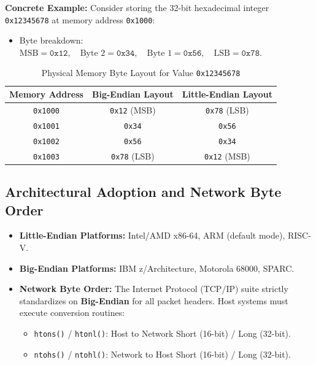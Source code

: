 \textbf{Concrete Example:} Consider storing the 32-bit hexadecimal integer \texttt{0x12345678} at memory address \texttt{0x1000}:
\begin{itemize}
    \item Byte breakdown: $\text{MSB} = \texttt{0x12}, \quad \text{Byte 2} = \texttt{0x34}, \quad \text{Byte 1} = \texttt{0x56}, \quad \text{LSB} = \texttt{0x78}$.
\end{itemize}

\begin{table}[htbp]
\centering
\small
\caption{Physical Memory Byte Layout for Value \texttt{0x12345678}}
\label{tab:endian_layout}
\begin{tabular}{c c c}
\toprule
\textbf{Memory Address} & \textbf{Big-Endian Layout} & \textbf{Little-Endian Layout} \\
\midrule
\texttt{0x1000} & \texttt{0x12} (MSB) & \texttt{0x78} (LSB) \\
\texttt{0x1001} & \texttt{0x34} & \texttt{0x56} \\
\texttt{0x1002} & \texttt{0x56} & \texttt{0x34} \\
\texttt{0x1003} & \texttt{0x78} (LSB) & \texttt{0x12} (MSB) \\
\bottomrule
\end{tabular}
\end{table}

\subsection{Architectural Adoption and Network Byte Order}
\begin{itemize}
    \item \textbf{Little-Endian Platforms:} Intel/AMD x86-64, ARM (default mode), RISC-V.
    \item \textbf{Big-Endian Platforms:} IBM z/Architecture, Motorola 68000, SPARC.
    \item \textbf{Network Byte Order:} The Internet Protocol (TCP/IP) suite strictly standardizes on \textbf{Big-Endian} for all packet headers. Host systems must execute conversion routines:
    \begin{itemize}
        \item \texttt{htons()} / \texttt{htonl()}: Host to Network Short (16-bit) / Long (32-bit).
        \item \texttt{ntohs()} / \texttt{ntohl()}: Network to Host Short (16-bit) / Long (32-bit).
    \end{itemize}
\end{itemize}


